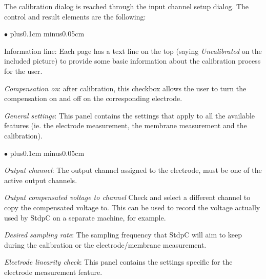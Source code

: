 \documentclass{article}
\newenvironment{myitem}{\begin{list}{$\bullet$}{\setlength{\leftmargin}{1.1em}
\itemsep0.1cm plus0.1cm minus0.05cm
\listparindent0cm
\addtolength{\labelsep}{0.5\labelsep}
\setlength{\labelwidth}{0.8em}
\setlength{\leftmargin}{\labelwidth}
\addtolength{\leftmargin}{\labelsep}
}}{\end{list}}
\begin{document}
The calibration dialog is reached through the input channel setup dialog.
The control and result elements are the following:  
\begin{myitem}
\item Information line: Each page has a text line on the top (saying
  \emph{Uncalibrated} on the included picture) to provide some basic
  information about the calibration process for the user. 
\item \emph{Compensation on}: after calibration, this checkbox allows the
  user to turn the compensation on and off on the corresponding electrode.
\end{myitem}
\emph{General settings}: This panel contains the settings that
  apply to all the available features (ie. the electrode measurement, the
  membrane measurement and the calibration).
\begin{myitem}
\item \emph{Output channel}: The output channel assigned to the
  electrode, must be one of the active output channels.
\item \emph{Output compensated voltage to channel} Check and select a different
  channel to copy the compensated voltage to. This can be used to record the
  voltage actually used by StdpC on a separate machine, for example.
\item \emph{Desired sampling rate}: The sampling frequency that StdpC will
  aim to keep during the calibration or the electrode/membrane measurement.
\end{myitem}
\emph{Electrode linearity check}: This panel contains the settings specific for
  the electrode measurement feature.
\end{document}
